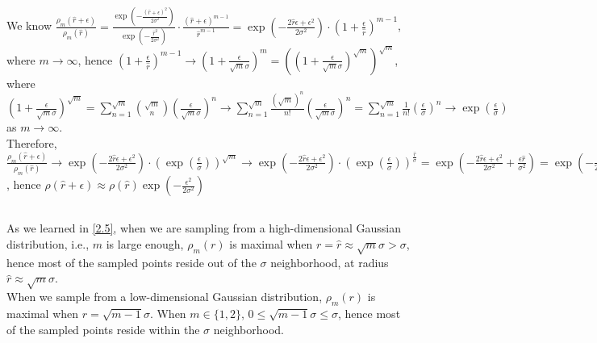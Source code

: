 \documentclass{article}
\begin{document}
        \subsection{}
        We know $\frac{\rho_m(\hat{r}+\epsilon)}{\rho_m(\hat{r})}
        =\frac{\exp(-\frac{(\hat{r}+\epsilon)^2}{2\sigma^2})}{\exp(-\frac{\hat{r}^2}{2\sigma^2})}\cdot\frac{(\hat{r}+\epsilon)^{m-1}}{\hat{r}^{m-1}}
        =\exp(-\frac{2\hat{r}\epsilon+\epsilon^2}{2\sigma^2})\cdot (1+\frac{\epsilon}{\hat{r}})^{m-1}$, where $m\to\infty$, 
        hence $(1+\frac{\epsilon}{\hat{r}})^{m-1}\to(1+\frac{\epsilon}{\sqrt{m}\sigma})^m=\left((1+\frac{\epsilon}{\sqrt{m}\sigma})^{\sqrt{m}}\right)^{\sqrt{m}}$,
        where $(1+\frac{\epsilon}{\sqrt{m}\sigma})^{\sqrt{m}}=\sum_{n=1}^{\sqrt{m}}{\sqrt{m}\choose n}\left(\frac{\epsilon}{\sqrt{m}\sigma}\right)^n
        \to\sum_{n=1}^{\sqrt{m}}\frac{(\sqrt{m})^n}{n!}\left(\frac{\epsilon}{\sqrt{m}\sigma}\right)^n=\sum_{n=1}^{\sqrt{m}}\frac{1}{n!}\left(\frac{\epsilon}{\sigma}\right)^n
        \to\exp(\frac{\epsilon}{\sigma})$ as $m\to\infty$.\\
        Therefore, $\frac{\rho_m(\hat{r}+\epsilon)}{\rho_m(\hat{r})}\to
        \exp(-\frac{2\hat{r}\epsilon+\epsilon^2}{2\sigma^2})\cdot\left(\exp(\frac{\epsilon}{\sigma})\right)^{\sqrt{m}}
        \to\exp(-\frac{2\hat{r}\epsilon+\epsilon^2}{2\sigma^2})\cdot\left(\exp(\frac{\epsilon}{\sigma})\right)^{\frac{\hat{r}}{\sigma}}
        =\exp(-\frac{2\hat{r}\epsilon+\epsilon^2}{2\sigma^2}+\frac{\epsilon\hat{r}}{\sigma^2})=\exp(-\frac{\epsilon^2}{2\sigma^2})$, 
        hence $\rho(\hat{r}+\epsilon)\approx\rho(\hat{r})\exp(-\frac{\epsilon^2}{2\sigma^2})$

        \subsection{}
        As we learned in \ref{2.5}, when we are sampling from a high-dimensional Gaussian distribution, i.e., $m$ is large enough, 
        $\rho_m(r)$ is maximal when $r=\hat{r}\approx\sqrt{m}\sigma>\sigma$, hence most of the sampled points reside out of the $\sigma$ neighborhood, at radius $\hat{r}\approx\sqrt{m}\sigma$.\\
        When we sample from a low-dimensional Gaussian distribution, $\rho_m(r)$ is maximal when $r=\sqrt{m-1}\sigma$. When $m\in\{1,2\}$, $0\leq\sqrt{m-1}\sigma\leq \sigma$,
        hence most of the sampled points reside within the $\sigma$ neighborhood.
\end{document}
